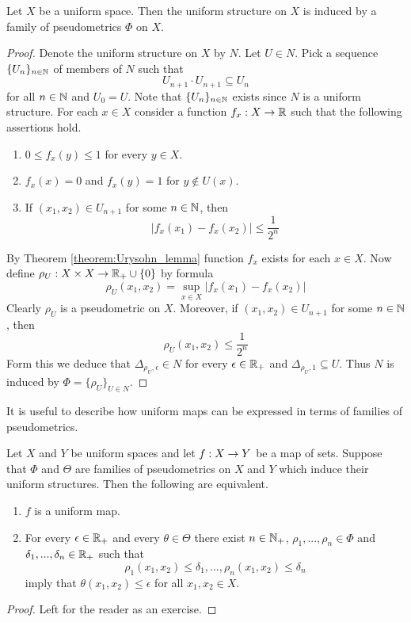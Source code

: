 \documentclass[10pt]{amsart}
\begin{document}
\begin{theorem}\label{theorem:each_uniform_structure_is_induced_by_pseudometrics}
	Let $X$ be a uniform space. Then the uniform structure on $X$ is induced by a family of pseudometrics $\Phi$ on $X$.
\end{theorem}
\begin{proof}
	Denote the uniform structure on $X$ by $N$. Let $U \in N$. Pick a sequence $\{U_n\}_{n\in {\mathbb N}}$ of members of $N$ such that
	$$U_{n+1}\cdot U_{n+1} \subseteq U_n$$
	for all $n \in {\mathbb N}$ and $U_0 = U$. Note that $\{U_n\}_{n\in {\mathbb N}}$ exists since $N$ is a uniform structure. For each $x \in X$ consider a function $f_x:X\rightarrow {\mathbb R}$ such that the following assertions hold.
	\begin{enumerate}[label=\textbf{(\arabic*)}, leftmargin=3.0em]
		\item $0\leq f_x(y) \leq 1$ for every $y \in X$.
		\item $f_x(x) = 0$ and $f_x(y) = 1$ for $y \not \in U(x)$.
		\item If $(x_1,x_2) \in U_{n+1}$ for some $n \in {\mathbb N}$, then
		      $$|f_x(x_1) - f_x(x_2)| \leq \frac{1}{2^n}$$
	\end{enumerate}
	By Theorem \ref{theorem:Urysohn_lemma} function $f_x$ exists for each $x \in X$. Now define $\rho_U:X\times X\rightarrow {\mathbb R}_+\cup \{0\}$ by formula
	$$\rho_U(x_1,x_2) = \sup_{x\in X}|f_x(x_1) - f_x(x_2)|$$
	Clearly $\rho_U$ is a pseudometric on $X$. Moreover, if $(x_1,x_2) \in U_{n+1}$ for some $n \in {\mathbb N}$, then
	$$\rho_U(x_1,x_2) \leq \frac{1}{2^n}$$
	Form this we deduce that $\Delta_{\rho_U, \epsilon} \in N$ for every $\epsilon \in {\mathbb R}_+$ and $\Delta_{\rho_U, 1}\subseteq U$. Thus $N$ is induced by $\Phi = \{\rho_U\}_{U \in N}$.
\end{proof}
\noindent
It is useful to describe how uniform maps can be expressed in terms of families of pseudometrics.

\begin{fact}\label{fact:uniform_maps_in_terms_of_pseudometrics}
	Let $X$ and $Y$ be uniform spaces and let $f:X\rightarrow Y$ be a map of sets. Suppose that $\Phi$ and $\Theta$ are families of pseudometrics on $X$ and $Y$ which induce their uniform structures. Then the following are equivalent.
	\begin{enumerate}[label=\emph{\textbf{(\roman*)}}, leftmargin=3.0em]
		\item $f$ is a uniform map.
		\item For every $\epsilon \in {\mathbb R}_+$ and every $\theta \in \Theta$ there exist $n \in {\mathbb N}_+$, $\rho_1,...,\rho_n \in \Phi$ and $\delta_1,...,\delta_n \in {\mathbb R}_+$ such that
		      $$\rho_1(x_1,x_2) \leq \delta_1,...,\rho_n(x_1, x_2) \leq \delta_n$$
		      imply that $\theta(x_1,x_2) \leq \epsilon$ for all $x_1,x_2 \in X$.
	\end{enumerate}
\end{fact}
\begin{proof}
	Left for the reader as an exercise.
\end{proof}
\end{document}
